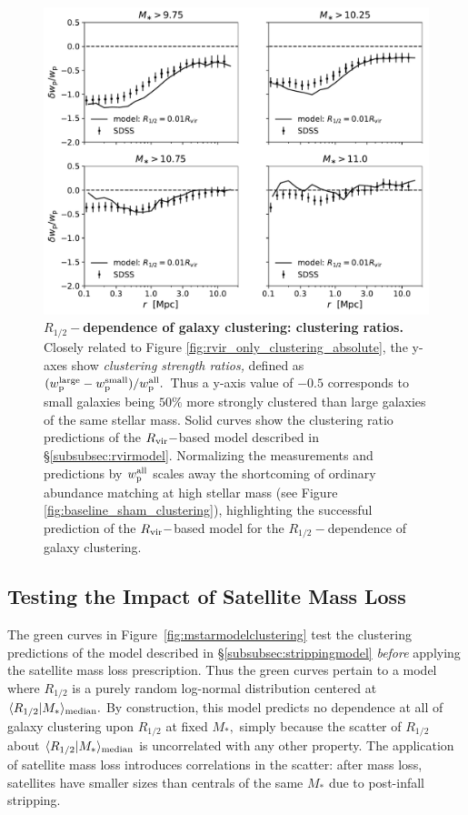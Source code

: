 \documentclass[usenatbib,usegraphicx,letterpaper]{mn2e}
\newcommand{\rhalf}{R_{1/2}}
\newcommand{\mstar}{M_{\ast}}
\newcommand{\rvir}{R_{\rm vir}}
\newcommand{\median}[2]{\langle{#1}\vert{#2}\rangle_{\rm median}}
\begin{document}
\begin{figure}
\centering
\includegraphics[width=12cm]{FIGS/rvir_only_wp_ratios.pdf}
\caption{
{\bf $\rhalf-$dependence of galaxy clustering: clustering ratios.}
Closely related to Figure \ref{fig:rvir_only_clustering_absolute}, the y-axes show {\em clustering strength ratios,} defined as $(w_{\rm p}^{\rm large} - w_{\rm p}^{\rm small})/w_{\rm p}^{\rm all}.$ Thus a y-axis value of $-0.5$ corresponds to small galaxies being $50\%$ more strongly clustered than large galaxies of the same stellar mass. Solid curves show the clustering ratio predictions of the $\rvir-$based model described in \S\ref{subsubsec:rvirmodel}. Normalizing the measurements and predictions by $w_{\rm p}^{\rm all}$ scales away the shortcoming of ordinary abundance matching at high stellar mass (see Figure \ref{fig:baseline_sham_clustering}), highlighting the successful prediction of the $\rvir-$based model for the $\rhalf-$dependence of galaxy clustering.
}
\label{fig:clustering_ratio_upshot}
\end{figure}

\subsection{Testing the Impact of Satellite Mass Loss}
\label{subsec:mstar_stripping}

The green curves in Figure~\ref{fig:mstarmodelclustering} test the clustering predictions of the model described in \S\ref{subsubsec:strippingmodel} {\em before} applying the satellite mass loss prescription. Thus the green curves pertain to a model where $\rhalf$ is a purely random log-normal distribution centered at $\median{\rhalf}{\mstar}.$ By construction, this model predicts no dependence at all of galaxy clustering upon $\rhalf$ at fixed $\mstar,$ simply because the scatter of $\rhalf$ about $\median{\rhalf}{\mstar}$ is uncorrelated with any other property. The application of satellite mass loss introduces correlations in the scatter: after mass loss, satellites have smaller sizes than centrals of the same $\mstar$ due to post-infall stripping.
\end{document}

